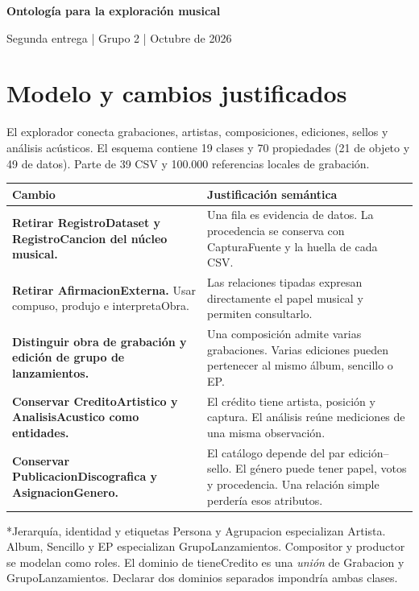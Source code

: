 \documentclass[11pt,a4paper]{article}
\makeatletter
\renewcommand\subsection{\@startsection{subsection}{2}{\z@}{-2ex plus -.5ex minus -.2ex}{.8ex plus .2ex}{\normalfont\normalsize\bfseries}}
\makeatother
\begin{document}
\begin{center}
{\LARGE\bfseries Ontología para la exploración musical}\par
{\large Segunda entrega | Grupo 2 | Octubre de 2026}
\end{center}
\section{Modelo y cambios justificados}
El explorador conecta grabaciones, artistas, composiciones, ediciones, sellos y análisis acústicos. El esquema contiene 19 clases y 70 propiedades (21 de objeto y 49 de datos). Parte de 39 CSV y 100.000 referencias locales de grabación.

\begin{tabularx}{\textwidth}{@{}YY@{}}\toprule
\textbf{Cambio} & \textbf{Justificación semántica}\\\midrule
\textbf{Retirar RegistroDataset y RegistroCancion del núcleo musical.} & Una fila es evidencia de datos. La procedencia se conserva con CapturaFuente y la huella de cada CSV.\\\addlinespace[4pt]
\textbf{Retirar AfirmacionExterna.} Usar compuso, produjo e interpretaObra. & Las relaciones tipadas expresan directamente el papel musical y permiten consultarlo.\\\addlinespace[4pt]
\textbf{Distinguir obra de grabación y edición de grupo de lanzamientos.} & Una composición admite varias grabaciones. Varias ediciones pueden pertenecer al mismo álbum, sencillo o EP.\\\addlinespace[4pt]
\textbf{Conservar CreditoArtistico y AnalisisAcustico como entidades.} & El crédito tiene artista, posición y captura. El análisis reúne mediciones de una misma observación.\\\addlinespace[4pt]
\textbf{Conservar PublicacionDiscografica y AsignacionGenero.} & El catálogo depende del par edición--sello. El género puede tener papel, votos y procedencia. Una relación simple perdería esos atributos.\\\bottomrule
\end{tabularx}

\subsection*{Jerarquía, identidad y etiquetas}
Persona y Agrupacion especializan Artista. Album, Sencillo y EP especializan GrupoLanzamientos. Compositor y productor se modelan como roles. El dominio de tieneCredito es una \emph{unión} de Grabacion y GrupoLanzamientos. Declarar dos dominios separados impondría ambas clases.
\end{document}
